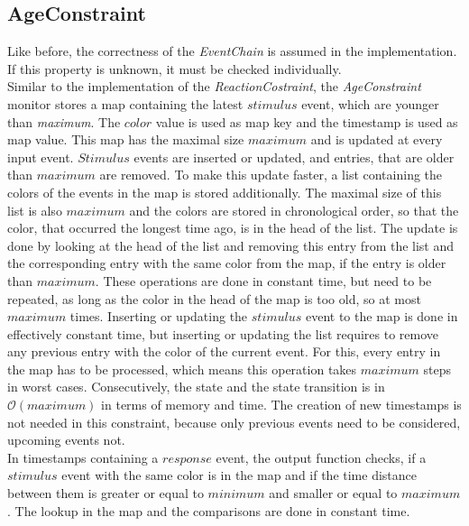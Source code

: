 \subsection{AgeConstraint}
	Like before, the correctness of the \textit{EventChain} is assumed in the implementation. If this property is unknown, it must be checked individually.\\
	Similar to the implementation of the \emph{ReactionCostraint}, the \emph{AgeConstraint} monitor stores a map containing the latest $stimulus$ event, which are younger than \textit{maximum}. The $color$ value is used as map key and the timestamp is used as map value. This map has the maximal size $maximum$ and is updated at every input event. $Stimulus$ events are inserted or updated, and entries, that are older than $maximum$ are removed. To make this update faster, a list containing the colors of the events in the map is stored additionally. The maximal size of this list is also $maximum$ and the colors are stored in chronological order, so that the color, that occurred the longest time ago, is in the head of the list. The update is done by looking at the head of the list and removing this entry from the list and the corresponding entry with the same color from the map, if the entry is older than $maximum$. These operations are done in constant time, but need to be repeated, as long as the color in the head of the map is too old, so at most $maximum$ times. Inserting or updating the $stimulus$ event to the map is done in effectively constant time, but inserting or updating the list requires to remove any previous entry with the color of the current event. For this, every entry in the map has to be processed, which means this operation takes $maximum$ steps in worst cases. Consecutively, the state and the state transition is in $\mathcal{O}(maximum)$ in terms of memory and time. The creation of new timestamps is not needed in this constraint, because only previous events need to be considered, upcoming events not.\\
	In timestamps containing a $response$ event, the output function checks, if a $stimulus$ event with the same color is in the map and if the time distance between them is greater or equal to $minimum$ and smaller or equal to $maximum$. The lookup in the map and the comparisons are done in constant time.

